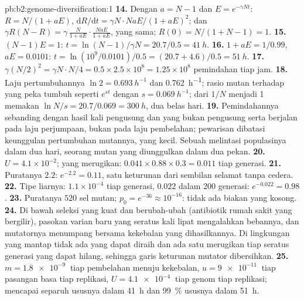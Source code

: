 \begin{solution}{pb:b2:genome-diversification:1}
\textbf{14.} Dengan $a = N - 1$ dan $E = e^{-\gamma Nt}$: $R = N/(1 +
aE)$, $\mathrm{d}R/\mathrm{d}t = \gamma N\cdot NaE/(1 + aE)^2$; dan
$\gamma R(N - R) = \gamma\,\frac{N}{1 + aE}\cdot\frac{NaE}{1 + aE}$,
yang sama; $R(0) = N/(1 + N - 1) = 1$.
\textbf{15.} $(N - 1)E = 1$: $t = \ln(N - 1)/\gamma N = 20.7/0.5 =
\qty{41}{h}$.
\textbf{16.} $1 + aE = 1/0.99$, $aE = 0.0101$: $t = \ln(10^{9}/0.0101)
/0.5 = (20.7 + 4.6)/0.5 = \qty{51}{h}$.
\textbf{17.} $\gamma (N/2)^2 = \gamma N\cdot N/4 = 0.5\times 2.5\times
10^{8} = 1.25\times 10^{8}$ pemindahan tiap jam.
\textbf{18.} Laju pertumbuhannya $\ln 2 = \qty{0.693}{h^{-1}}$ dan
\qty{0.762}{h^{-1}}; rasio mutan terhadap yang peka tumbuh seperti
$e^{st}$ dengan $s = \qty{0.069}{h^{-1}}$; dari $1/N$ menjadi 1
memakan $\ln N/s =
20.7/0.069 = \qty{300}{h}$, dua belas hari.
\textbf{19.} Pemindahannya sebanding dengan hasil kali pengusung dan
yang bukan pengusung serta berjalan pada laju perjumpaan, bukan pada
laju pembelahan; pewarisan dibatasi keunggulan pertumbuhan mutannya,
yang kecil. Sebuah  melintasi populasinya dalam dua hari,
seorang mutan yang diunggulkan dalam dua pekan.
\textbf{20.} $U = 4.1\times 10^{-2}$; yang merugikan: $0.041\times 0.88\times
0.3 = 0.011$ tiap generasi.
\textbf{21.} Puratanya $2.2$: $e^{-2.2} = 0.11$, satu keturunan dari
sembilan selamat tanpa cedera.
\textbf{22.} Tipe liarnya: $1.1\times 10^{-4}$ tiap generasi, $0.022$
dalam 200 generasi: $e^{-0.022} = 0.98$.
\textbf{23.} Puratanya $520$ sel mutan; $p_0 = e^{-36} \approx
10^{-16}$: tidak ada biakan yang kosong.
\textbf{24.} Di bawah seleksi yang kuat dan berubah-ubah (antibiotik
rumah sakit yang bergilir), pasokan varian baru yang seratus kali lipat
mengalahkan bebannya, dan mutatornya menumpang bersama kekebalan yang
dihasilkannya. Di lingkungan yang mantap tidak ada yang dapat diraih
dan ada satu  merugikan tiap seratus generasi yang dapat
hilang, sehingga garis keturunan mutator dibersihkan.
\textbf{25.} $m = \qty{1.8e-9}{}$ tiap pembelahan menuju kekebalan, $u =
\qty{9e-11}{}$ tiap pasangan basa tiap replikasi,
$U = \qty{4.1e-4}{}$  tiap genom tiap replikasi; 
mencapai separuh ususnya dalam \qty{41}{h} dan \qty{99}{\%} ususnya
dalam \qty{51}{h}.
\end{solution}
